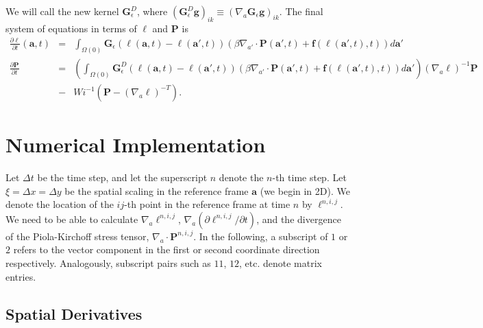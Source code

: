 \documentclass[12pt]{article}
\newcommand{\baa}[1]{\begin{eqnarray} #1 \end{eqnarray}}
\newcommand{\pd}[2]{\ensuremath{\frac{\partial #1}{\partial #2}}}
\newcommand{\ba}{{\mathbf a}}
\newcommand{\bl}{{\pmb \ell}}
\newcommand{\bg}{{\mathbf g}}
\newcommand{\ff}{{\mathbf f}}
\newcommand{\bG}{{\mathbf G}}
\newcommand{\bP}{{\mathbf P}}
\newcommand{\eps}{\epsilon}
\newcommand{\Ge}{\bG_\eps}
\begin{document}
	We will call the new kernel $\Ge^D$, where $(\Ge^D\bg)_{ik} \equiv (\nabla_a \Ge\bg)_{ik}$. The final system of equations in terms of $\bl$ and $\bP$ is 
	\baa{
	\pd{\bl}{t}(\ba,t) &=& \int_{\Omega(0)} \Ge(\bl(\ba,t) - \bl(\ba',t)) \left( \beta \nabla_{a'} \cdot \bP(\ba',t) + \ff(\bl(\ba',t),t) \right) d\ba' \label{eqn:l}\\
	\pd{\bP}{t} &=& \left(\int_{\Omega(0)} \Ge^D(\bl(\ba,t) - \bl(\ba',t)) \left( \beta \nabla_{a'} \cdot \bP(\ba',t) + \ff(\bl(\ba',t),t) \right) d\ba' \right)\left(\nabla_a \bl \right)^{-1}\bP \nonumber\\
	&-& Wi^{-1}\left( \bP - \left(\nabla_a \bl \right)^{-T} \right). \label{eqn:P}
	}
	
	
	\section{Numerical Implementation}
	
	Let $\Delta t$ be the time step, and let the superscript $n$ denote the $n$-th time step. Let $\xi=\Delta x = \Delta y$ be the spatial scaling in the reference frame $\ba$ (we begin in 2D). We denote the location of the $ij$-th point in the reference frame at time $n$ by $\bl^{n,i,j}$. We need to be able to calculate $\nabla_a \bl^{n,i,j}$, $\nabla_a (\partial \bl^{n,i,j}/\partial t)$, and the divergence of the Piola-Kirchoff stress tensor, $\nabla_a \cdot \bP^{n,i,j}$. In the following, a subscript of $1$ or $2$ refers to the vector component in the first or second coordinate direction respectively. Analogously, subscript pairs such as $11$, $12$, etc. denote matrix entries.
	
	\subsection{Spatial Derivatives}\label{sec:spdiff}
	
\end{document}
